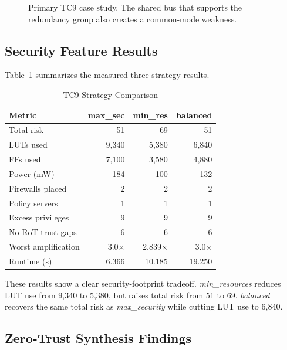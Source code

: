 \documentclass[conference]{IEEEtran}
\begin{document}
\begin{figure}[t]
\centering
{}
\caption{Primary TC9 case study. The shared bus that supports the redundancy
group also creates a common-mode weakness.}
\label{fig:tc9}
\end{figure}

\subsection{Security Feature Results}

Table~\ref{tab:tc9} summarizes the measured three-strategy results.

\begin{table}[t]
\caption{TC9 Strategy Comparison}
\label{tab:tc9}
\centering
\scriptsize
\begin{tabular}{lrrr}
\toprule
Metric & max\_sec & min\_res & balanced \\
\midrule
Total risk         & 51    & 69    & 51 \\
LUTs used          & 9,340 & 5,380 & 6,840 \\
FFs used           & 7,100 & 3,580 & 4,880 \\
Power (mW)         & 184   & 100   & 132 \\
Firewalls placed   & 2     & 2     & 2 \\
Policy servers     & 1     & 1     & 1 \\
Excess privileges  & 9     & 9     & 9 \\
No-RoT trust gaps  & 6     & 6     & 6 \\
Worst amplification& 3.0$\times$ & 2.839$\times$ & 3.0$\times$ \\
Runtime (s)        & 6.366 & 10.185 & 19.250 \\
\bottomrule
\end{tabular}
\end{table}

These results show a clear security-footprint tradeoff. \textit{min\_resources}
reduces LUT use from 9,340 to 5,380, but raises total risk from 51 to 69.
\textit{balanced} recovers the same total risk as \textit{max\_security}
while cutting LUT use to 6,840.

\subsection{Zero-Trust Synthesis Findings}
\end{document}

